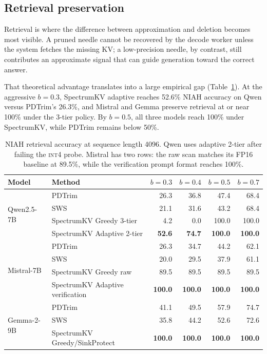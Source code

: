 \documentclass[11pt]{article}
\newcommand{\method}{SpectrumKV}
\newcommand{\niah}{NIAH}
\newcommand{\budget}{b}
\newcommand{\pct}{\%}
\newcommand{\intiv}{\textsc{int4}}
\theoremstyle{plain}
\theoremstyle{definition}
\begin{document}
\subsection{Retrieval preservation}
\label{sec:rq11}

Retrieval is where the difference between approximation and deletion becomes most visible.  A pruned needle cannot be recovered by the decode worker unless the system fetches the missing KV; a low-precision needle, by contrast, still contributes an approximate signal that can guide generation toward the correct answer.

That theoretical advantage translates into a large empirical gap (Table~\ref{tab:niah}).  At the aggressive $\budget=0.3$, \method{} adaptive reaches 52.6\pct{} NIAH accuracy on Qwen versus PDTrim's 26.3\pct{}, and Mistral and Gemma preserve retrieval at or near 100\pct{} under the 3-tier policy.  By $\budget=0.5$, all three models reach 100\pct{} under \method{}, while PDTrim remains below 50\pct{}.

\begin{table}[t]
\centering
\caption{\niah{} retrieval accuracy at sequence length 4096.  Qwen uses adaptive 2-tier after failing the \intiv{} probe.  Mistral has two rows: the raw scan matches its FP16 baseline at 89.5\pct{}, while the verification prompt format reaches 100\pct{}.}
\label{tab:niah}
\small
\begin{tabular}{llrrrr}
\toprule
Model & Method & $\budget=0.3$ & $\budget=0.4$ & $\budget=0.5$ & $\budget=0.7$ \\
\midrule
\multirow{4}{*}{Qwen2.5-7B}
  & PDTrim & 26.3 & 36.8 & 47.4 & 68.4 \\
  & SWS & 21.1 & 31.6 & 43.2 & 68.4 \\
  & \method{} Greedy 3-tier & 4.2 & 0.0 & 100.0 & 100.0 \\
  & \method{} Adaptive 2-tier & \textbf{52.6} & \textbf{74.7} & \textbf{100.0} & \textbf{100.0} \\
\midrule
\multirow{4}{*}{Mistral-7B}
  & PDTrim & 26.3 & 34.7 & 44.2 & 62.1 \\
  & SWS & 20.0 & 29.5 & 37.9 & 61.1 \\
  & \method{} Greedy raw & 89.5 & 89.5 & 89.5 & 89.5 \\
  & \method{} Adaptive verification & \textbf{100.0} & \textbf{100.0} & \textbf{100.0} & \textbf{100.0} \\
\midrule
\multirow{3}{*}{Gemma-2-9B}
  & PDTrim & 41.1 & 49.5 & 57.9 & 74.7 \\
  & SWS & 35.8 & 44.2 & 52.6 & 72.6 \\
  & \method{} Greedy/SinkProtect & \textbf{100.0} & \textbf{100.0} & \textbf{100.0} & \textbf{100.0} \\
\bottomrule
\end{tabular}
\end{table}
\end{document}
